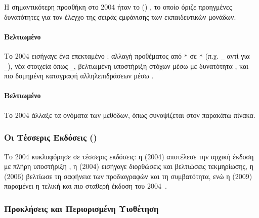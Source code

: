 Η σημαντικότερη προσθήκη στο  2004 ήταν το    () , το οποίο όριζε προηγμένες δυνατότητες για τον έλεγχο της σειράς εμφάνισης των εκπαιδευτικών μονάδων.


\paragraph{Βελτιωμένο  }

Το  2004 εισήγαγε ένα επεκταμένο  : αλλαγή προθέματος από \texttt{*} σε \texttt{*} (π.χ. \texttt{\_} αντί για \texttt{\_}), νέα στοιχεία όπως \texttt{\_}, βελτιωμένη υποστήριξη στόχων μέσω \texttt{} με δυνατότητα \textit{ }, και πιο δομημένη καταγραφή αλληλεπιδράσεων μέσω \texttt{}.

\paragraph{Βελτιωμένο }

Το  2004 άλλαξε τα ονόματα των  μεθόδων, όπως συνοψίζεται στον παρακάτω πίνακα.



\subsubsection{Οι Τέσσερις Εκδόσεις ()}

Το  2004 κυκλοφόρησε σε τέσσερις εκδόσεις: η   (2004) αποτέλεσε την αρχική έκδοση με πλήρη υποστήριξη , η   (2004) εισήγαγε διορθώσεις  και βελτιώσεις τεκμηρίωσης, η   (2006) βελτίωσε τη σαφήνεια των προδιαγραφών και τη συμβατότητα, ενώ η   (2009) παραμένει η τελική και πιο σταθερή έκδοση του  2004~\cite{adl2009scorm2004}.

\subsubsection{Προκλήσεις και Περιορισμένη Υιοθέτηση}

